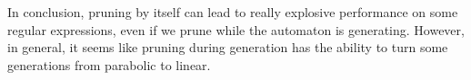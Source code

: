 \resizebox{\columnwidth}{!}{
    
}

\resizebox{\columnwidth}{!}{
    
}
\label{fig:mean6-8}
\vspace{0.75em}

In conclusion, pruning by itself can lead to really explosive performance on some regular expressions, even if we prune while the automaton is generating.
However, in general, it seems like pruning during generation has the ability to turn some generations from parabolic to linear.
